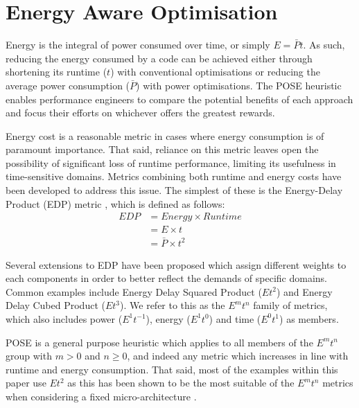 \section{Energy Aware Optimisation}
\label{sec:optimisation}

Energy is the integral of power consumed over time, or simply $E = \bar{P}t$.
As such, reducing the energy consumed by a code can be achieved either through shortening its runtime ($t$) with conventional optimisations or reducing the average power consumption ($\bar{P}$) with power optimisations.
The POSE heuristic enables performance engineers to compare the potential benefits of each approach and focus their efforts on whichever offers the greatest rewards.

Energy cost is a reasonable metric in cases where energy consumption is of paramount importance.
That said, reliance on this metric leaves open the possibility of significant loss of runtime performance, limiting its usefulness in time-sensitive domains.
Metrics combining both runtime and energy costs have been developed to address this issue. 
The simplest of these is the Energy-Delay Product (EDP) metric \cite{gonzales:1995aa}, which is defined as follows:
\begin{align}
  EDP &= Energy \times Runtime \nonumber \\
      &= E \times t \nonumber \\
      &= \bar{P} \times t^2
  \label{eq:edp}
\end{align}

Several extensions to EDP have been proposed which assign different weights to each components in order to better reflect the demands of specific domains.
Common examples include Energy Delay Squared Product ($Et^{2}$) and Energy Delay Cubed Product ($Et^{3}$).
We refer to this as the $E^mt^n$ family of metrics, which also includes power ($E^1t^{-1}$), energy ($E^1t^0$) and time ($E^0t^1$) as members.

POSE is a general purpose heuristic which applies to all members of the $E^mt^n$ group with $m > 0$ and $n \geq 0$, and indeed any metric which increases in line with runtime and energy consumption.
That said, most of the examples within this paper use $Et^2$ as this has been shown to be the most suitable of the $E^mt^n$ metrics when considering a fixed micro-architecture \cite{brooks:2000aa}.
